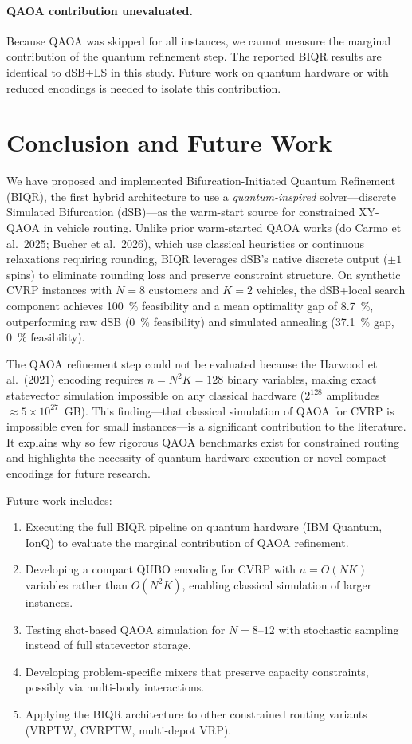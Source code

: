 \documentclass[11pt,a4paper]{article}
\theoremstyle{definition}
\begin{document}
\paragraph{QAOA contribution unevaluated.} Because QAOA was skipped for all instances, we cannot measure the marginal contribution of the quantum refinement step. The reported BIQR results are identical to dSB+LS in this study. Future work on quantum hardware or with reduced encodings is needed to isolate this contribution.

\section{Conclusion and Future Work}\label{sec:conclusion}

We have proposed and implemented Bifurcation-Initiated Quantum Refinement (BIQR), the first hybrid architecture to use a \emph{quantum-inspired} solver---discrete Simulated Bifurcation (dSB)---as the warm-start source for constrained XY-QAOA in vehicle routing. Unlike prior warm-started QAOA works (do Carmo et al.\ 2025; Bucher et al.\ 2026), which use classical heuristics or continuous relaxations requiring rounding, BIQR leverages dSB's native discrete output ($\pm 1$ spins) to eliminate rounding loss and preserve constraint structure. On synthetic CVRP instances with $N=8$ customers and $K=2$ vehicles, the dSB+local search component achieves \SI{100}{\percent} feasibility and a mean optimality gap of \SI{8.7}{\percent}, outperforming raw dSB (\SI{0}{\percent} feasibility) and simulated annealing (\SI{37.1}{\percent} gap, \SI{0}{\percent} feasibility).

The QAOA refinement step could not be evaluated because the Harwood et al.\ (2021) encoding requires $n = N^2 K = 128$ binary variables, making exact statevector simulation impossible on any classical hardware ($2^{128}$ amplitudes $\approx 5 \times 10^{27}$~GB). This finding---that classical simulation of QAOA for CVRP is impossible even for small instances---is a significant contribution to the literature. It explains why so few rigorous QAOA benchmarks exist for constrained routing and highlights the necessity of quantum hardware execution or novel compact encodings for future research.

Future work includes:
\begin{enumerate}
    \item Executing the full BIQR pipeline on quantum hardware (IBM Quantum, IonQ) to evaluate the marginal contribution of QAOA refinement.
    \item Developing a compact QUBO encoding for CVRP with $n = O(NK)$ variables rather than $O(N^2 K)$, enabling classical simulation of larger instances.
    \item Testing shot-based QAOA simulation for $N=8$--$12$ with stochastic sampling instead of full statevector storage.
    \item Developing problem-specific mixers that preserve capacity constraints, possibly via multi-body interactions.
    \item Applying the BIQR architecture to other constrained routing variants (VRPTW, CVRPTW, multi-depot VRP).
\end{enumerate}
\end{document}
